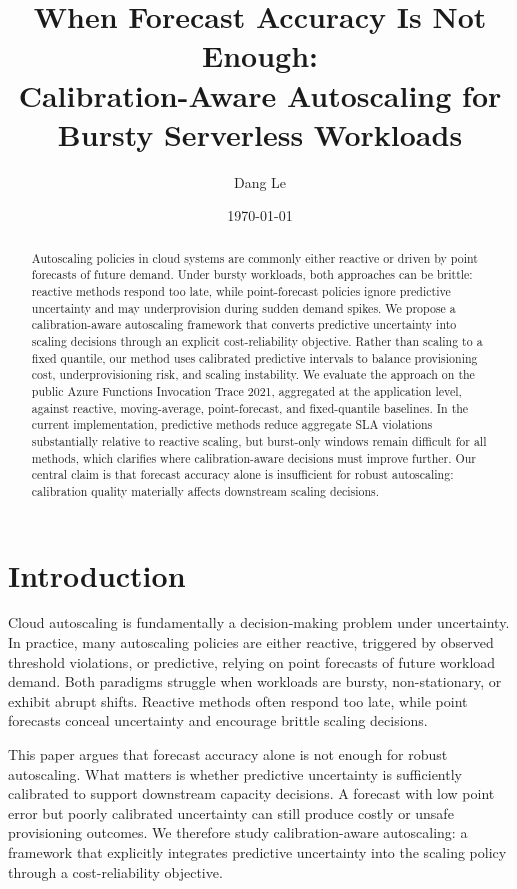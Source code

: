 \documentclass[11pt]{article}
\title{When Forecast Accuracy Is Not Enough:\\Calibration-Aware Autoscaling for Bursty Serverless Workloads}
\author{Dang Le}
\date{\today}
\theoremstyle{plain}
\theoremstyle{definition}
\theoremstyle{remark}
\begin{document}
\maketitle

\begin{abstract}
Autoscaling policies in cloud systems are commonly either reactive or driven by point forecasts of future demand. Under bursty workloads, both approaches can be brittle: reactive methods respond too late, while point-forecast policies ignore predictive uncertainty and may underprovision during sudden demand spikes. We propose a calibration-aware autoscaling framework that converts predictive uncertainty into scaling decisions through an explicit cost-reliability objective. Rather than scaling to a fixed quantile, our method uses calibrated predictive intervals to balance provisioning cost, underprovisioning risk, and scaling instability. We evaluate the approach on the public Azure Functions Invocation Trace 2021, aggregated at the application level, against reactive, moving-average, point-forecast, and fixed-quantile baselines. In the current implementation, predictive methods reduce aggregate SLA violations substantially relative to reactive scaling, but burst-only windows remain difficult for all methods, which clarifies where calibration-aware decisions must improve further. Our central claim is that forecast accuracy alone is insufficient for robust autoscaling: calibration quality materially affects downstream scaling decisions.
\end{abstract}

\section{Introduction}
Cloud autoscaling is fundamentally a decision-making problem under uncertainty. In practice, many autoscaling policies are either reactive, triggered by observed threshold violations, or predictive, relying on point forecasts of future workload demand. Both paradigms struggle when workloads are bursty, non-stationary, or exhibit abrupt shifts. Reactive methods often respond too late, while point forecasts conceal uncertainty and encourage brittle scaling decisions.

This paper argues that forecast accuracy alone is not enough for robust autoscaling. What matters is whether predictive uncertainty is sufficiently calibrated to support downstream capacity decisions. A forecast with low point error but poorly calibrated uncertainty can still produce costly or unsafe provisioning outcomes. We therefore study calibration-aware autoscaling: a framework that explicitly integrates predictive uncertainty into the scaling policy through a cost-reliability objective.
\end{document}
